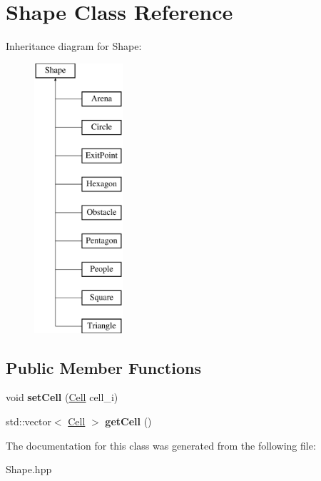 \hypertarget{class_shape}{}\section{Shape Class Reference}
\label{class_shape}
Inheritance diagram for Shape\+:\begin{figure}[H]
\begin{center}
\leavevmode
\includegraphics[height=10.000000cm]{class_shape}
\end{center}
\end{figure}
\subsection*{Public Member Functions}
\begin{DoxyCompactItemize}
\item 
\mbox{\label{class_shape_a9f07382e9173d32feaa737fe57560c9c}} 
void {\bfseries set\+Cell} (\mbox{\hyperlink{class_cell}{Cell}} cell\+\_\+i)
\item 
\mbox{\label{class_shape_ad1951cad2df16392cab74b472020b851}} 
std\+::vector$<$ \mbox{\hyperlink{class_cell}{Cell}} $>$ {\bfseries get\+Cell} ()
\end{DoxyCompactItemize}


The documentation for this class was generated from the following file\+:\begin{DoxyCompactItemize}
\item 
Shape.\+hpp\end{DoxyCompactItemize}
